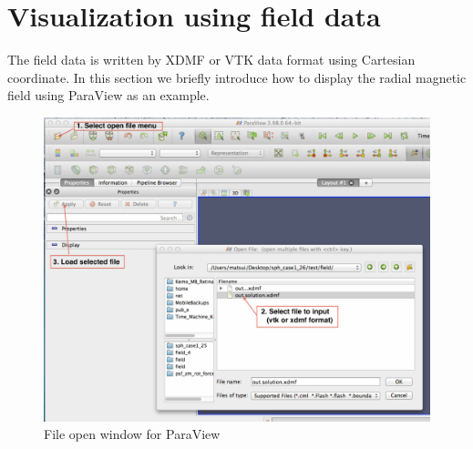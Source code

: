 \section{Visualization using field data}
\label{sec:paraview}
The field data is written by XDMF or VTK data format using Cartesian coordinate. In this section we briefly introduce how to display the radial magnetic field using ParaView as an example.
%
\begin{figure}[htbp]
\begin{center}
\includegraphics*[width=130mm]{images/paraview_open}
\caption{File open window for ParaView}
\label{fig:paraview_load}
\end{center}
\end{figure}
%

